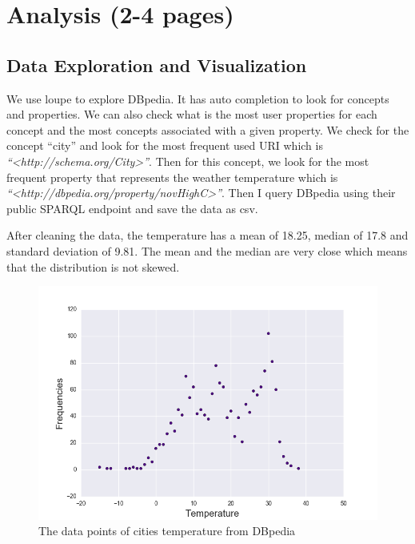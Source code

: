 \documentclass{article}
\begin{document}
\section{Analysis (2-4 pages)}

\subsection{Data Exploration and Visualization}
We use loupe \cite{loupe} to explore DBpedia. It has auto completion to look for concepts and properties. We can also check what is the most user properties for each concept and the most concepts associated with a given property. We check for the concept ``city'' and look for the most frequent used URI which is \textit{``\textless http://schema.org/City\textgreater ''}. Then for this concept, we look for the most frequent property that represents the weather temperature which is \textit{``\textless http://dbpedia.org/property/novHighC\textgreater''}. Then I query DBpedia using their public SPARQL endpoint and save the data as csv. 

After cleaning the data, the temperature has a mean of 18.25, median of 17.8 and standard deviation of 9.81. The mean and the median are very close which means that the distribution is not skewed. 

\begin{figure}[!ht]
  \caption{The data points of cities temperature from DBpedia}
  \centering
    \includegraphics[width=1.0\textwidth]{tempscatt}
\end{figure}
\end{document}
